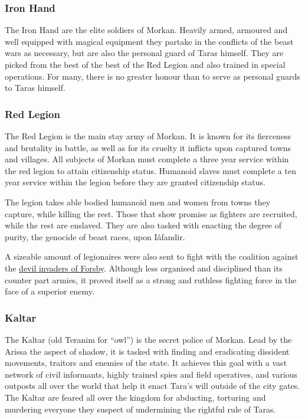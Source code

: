 \subsubsection{Iron Hand}
\label{sec:Iron Hand}

The Iron Hand are the elite soldiers of Morkan. Heavily armed, armoured
and well equipped with magical equipment they partake in the conflicts of the
beast wars as necessary, but are also the personal guard of Taras himself. They
are picked from the best of the best of the Red Legion and also trained
in special operations. For many, there is no greater honour than to serve as
personal guards to Taras himself.

\subsubsection{Red Legion}
\label{sec:Red Legion}

The Red Legion is the main stay army of Morkan. It is known for its
fierceness and brutality in battle, as well as for its cruelty it inflicts
upon captured towns and villages. All subjects of Morkan must complete a
three year service within the red legion to attain citizenship status. Humanoid
slaves must complete a ten year service within the legion before they are
granted citizenship status.

The legion takes able bodied humanoid men and women from towns they
capture, while killing the rest. Those that show promise as fighters are
recruited, while the rest are enslaved. They are also tasked with enacting the
degree of purity, the genocide of beast races, upon Iâfandir.

A sizeable amount of legionaires were also sent to fight with the coalition
against the \hyperref[sec:Devil Siege]{devil invaders of Forsby}. Although
less organised and disciplined than its counter part armies, it proved itself
as a strong and ruthless fighting force in the face of a superior enemy.

\subsubsection{Kaltar}
\label{sec:Kaltar}

The Kaltar (old Teranim for ``owl'') is the secret police of Morkan. Lead by
the Arissa the aspect of shadow, it is tasked with finding and eradicating
dissident movements, traitors and enemies of the state.  It achieves this goal
with a vast network of civil informants, highly trained spies and field
operatives, and various outposts all over the world that help it enact Tara's
will outside of the city gates. The Kaltar are feared all over the kingdom for
abducting, torturing and murdering everyone they suspect of undermining the
rightful rule of Taras.

